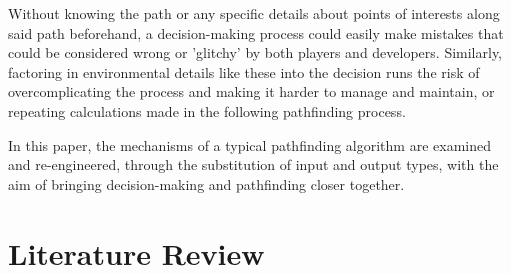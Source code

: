 \documentclass[10pt, twocolumn]{article}
\begin{document}
Without knowing the path or any specific details about points of interests along said path beforehand, a decision-making process could easily make mistakes that could be considered wrong or 'glitchy' by both players and developers. Similarly, factoring in environmental details like these into the decision runs the risk of overcomplicating the process and making it harder to manage and maintain, or repeating calculations made in the following pathfinding process.

In this paper, the mechanisms of a typical pathfinding algorithm are examined and re-engineered, through the substitution of input and output types, with the aim of bringing decision-making and pathfinding closer together.

\section{Literature Review}

\clearpage
\printbibliography
\end{document}
